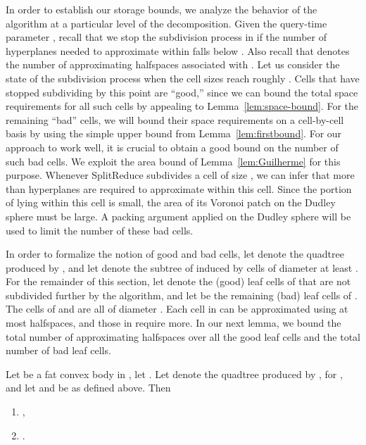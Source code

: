 \documentclass[11pt]{article}   \usepackage[letterpaper,hmargin=2.1cm,vmargin=3cm]{geometry}
\newcommand{\alg}{\textrm{SplitReduce}}
\begin{document}
In order to establish our storage bounds, we analyze the behavior of the algorithm at a particular level of the decomposition. Given the query-time parameter , recall that we stop the subdivision process in  if the number of hyperplanes needed to approximate  within  falls below . Also recall that  denotes the number of approximating halfspaces associated with . Let us consider the state of the subdivision process when the cell sizes reach roughly . Cells that have stopped subdividing by this point are ``good,'' since we can bound the total space requirements for all such cells by appealing to Lemma~\ref{lem:space-bound}. For the remaining ``bad'' cells, we will bound their space requirements on a cell-by-cell basis by using the simple upper bound from Lemma~\ref{lem:firstbound}. For our approach to work well, it is crucial to obtain a good bound on the number of such bad cells. We exploit the area bound of Lemma~\ref{lem:Guilherme} for this purpose. Whenever {\alg} subdivides a cell of size , we can infer that more than  hyperplanes are required to approximate  within this cell. Since the portion of  lying within this cell is small, the area of its Voronoi patch on the Dudley sphere must be large. A packing argument applied on the Dudley sphere will be used to limit the number of these bad cells.

In order to formalize the notion of good and bad cells, let  denote the quadtree produced by , and let  denote the subtree of  induced by cells of diameter at least . For the remainder of this section, let  denote the (good) leaf cells of  that are not subdivided further by the algorithm, and let  be the remaining (bad) leaf cells of . The cells of  and  are all of diameter . Each cell in  can be approximated using at most  halfspaces, and those in  require more. In our next lemma, we bound the total number of approximating halfspaces over all the good leaf cells and the total number of bad leaf cells. 

\begin{lemma} \label{lem:aux2}
Let  be a fat convex body in , let . Let  denote the quadtree produced by , for , and let  and  be as defined above. Then 
\begin{enumerate}
\item[] ,

\item[] .
\end{enumerate}
\end{lemma}
\end{document}
